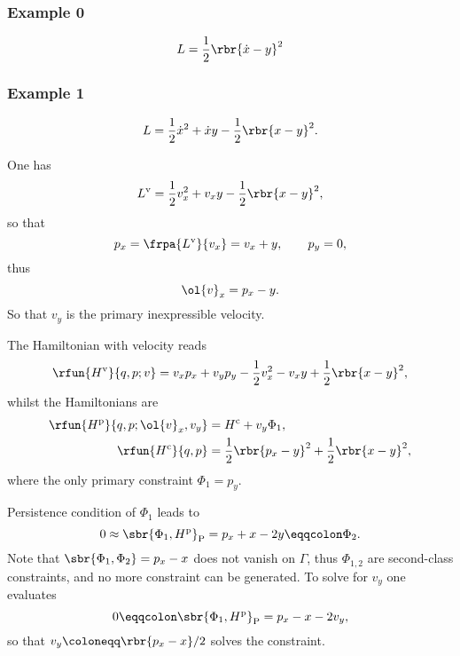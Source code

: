 \documentclass[a4paper,11pt]{article}
\begin{document}
\subsubsection*{Example 0}
\cite[sec.\ 1.2]{Gitman1990}
\begin{equation}
L = \frac{1}{2}\rbr{\dot{x}-y}^2
\end{equation}


\subsubsection*{Example 1}
\begin{equation}
L = \frac{1}{2} \dot{x}^2 + \dot{x} y - \frac{1}{2}\rbr{x-y}^2.
\end{equation}

One has
\begin{equation}
L^\text{v} = \frac{1}{2} v_x^2 + v_x y - \frac{1}{2} \rbr{x-y}^2,
\end{equation}
so that
\begin{equation}
p_x = \frpa{L^\text{v}}{v_x} = v_x + y, \qquad p_y = 0,
\end{equation}
thus
\begin{equation}
\ol{v}_x = p_x - y.
\end{equation}
So that $v_y$ is the primary inexpressible velocity.

The Hamiltonian with velocity reads
\begin{equation}
\rfun{H^\text{v}}{q, p; v} = v_x p_x + v_y p_y - \frac{1}{2} v_x^2 - v_x y 
+ \frac{1}{2}\rbr{x-y}^2,
\end{equation}
whilst the Hamiltonians are
\begin{align}
\rfun{H^\text{p}}{q, p; \ol{v}_x, v_y} &= H^\text{c} + v_y \Phi_1,\\
\rfun{H^\text{c}}{q, p} &= \frac{1}{2}\rbr{p_x - y}^2 + \frac{1}{2} \rbr{x-y}^2,
\end{align}
where the only primary constraint $\Phi_1 = p_y$.

Persistence condition of $\Phi_1$ leads to
\begin{equation}
0 \approx \sbr{\Phi_1, H^\text{p}}_\text{P} = p_x + x - 2y \eqqcolon \Phi_2.
\end{equation}
Note that $\sbr{\Phi_1, \Phi_2} = p_x - x$ does not vanish on $\Gamma$, thus 
$\Phi_{1,2}$ are second-class constraints, and no more constraint can be 
generated. To solve for $v_y$ one evaluates
\begin{equation}
0 \eqqcolon \sbr{\Phi_1, H^\text{p}}_\text{P} = p_x - x - 2v_y,
\end{equation}
so that $v_y \coloneqq \rbr{p_x - x}/2$ solves the constraint.
\end{document}
